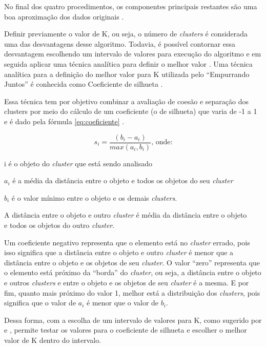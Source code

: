 No final dos quatro procedimentos, os componentes principais restantes são uma boa aproximação dos dados originais \cite{han2011data}.

Definir previamente o valor de K, ou seja, o número de \textit{clusters} é considerada uma das desvantagens desse algoritmo. Todavia,
é possível contornar essa desvantagem escolhendo um intervalo de valores para execução do algoritmo e em seguida aplicar
uma técnica analítica para definir o melhor valor \cite{han2011data}. Uma técnica analítica para a definição do melhor valor para K utilizada pelo ``Empurrando Juntos''
é conhecida como Coeficiente de silhueta \cite{sklearn}.

Essa técnica tem por objetivo combinar a avaliação de coesão e separação dos clusters por meio do cálculo de um coeficiente (o de silhueta) que 
varia de -1 a 1 e é dado pela fórmula \ref{eq:coeficiente} \cite{tan2013data}.

\begin{equation} \label{eq:coeficiente}
  s_{i} = \frac{(b_{i} - a_{i})}{max(a_{i}, b_{i})} \mbox{, onde:}
\end{equation}

{\addtolength{\leftskip}{8mm}
    i é o objeto do \textit{cluster} que está sendo analisado
    
    $a_{i}$ é a média da distância entre o objeto e todos os objetos do seu \textit{cluster}
    
    $b_{i}$ é o valor mínimo entre o objeto e os demais \textit{clusters}. 
    
	  \footnotesize \indent \indent A distância entre o objeto e outro \textit{cluster} é média da distância entre o objeto \\ \indent \indent e todos os objetos do outro \textit{cluster}.
}

Um coeficiente negativo representa que o elemento está no \textit{cluster} errado, pois isso significa que a distância entre o objeto e outro \textit{cluster} 
é menor que a distância entre o objeto e os objetos de seu \textit{cluster}. O valor ``zero'' representa que o elemento está próximo da ``borda'' do \textit{cluster}, ou seja,
a distância entre o objeto e outros \textit{clusters} e entre o objeto e os objetos de seu \textit{cluster} é a mesma. E por fim, quanto mais próximo do valor 1, melhor
está a distribuição dos \textit{clusters}, pois significa que o valor de $a_i$ é menor que o valor de $b_i$.

Dessa forma, com a escolha de um intervalo de valores para K, como sugerido por  e , permite testar os valores 
para o coeficiente de silhueta e escolher o melhor valor de K dentro do intervalo. 


